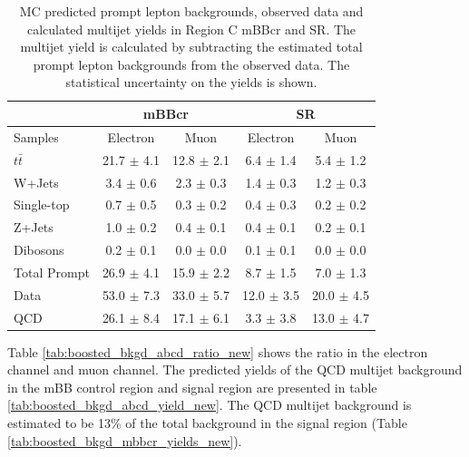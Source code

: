 \begin{table}
\begin{center}
\begin{tabular}{l|c|c||c|c}
             &\multicolumn{2}{c||}{mBBcr}               &\multicolumn{2}{c}{SR}\\
\hline
Samples       & Electron            & Muon               & Electron         & Muon     \\      
\hline
$t\bar{t}$          &   21.7	$\pm$ 4.1   &   12.8 $\pm$ 2.1	&  	6.4 $\pm$ 1.4		& 	5.4 $\pm$ 1.2\\
W+Jets          &   3.4 	$\pm$ 0.6   &    2.3 $\pm$ 0.3	&	1.4 $\pm$ 0.3		&  	1.2 $\pm$ 0.3\\
Single-top      &   0.7 	$\pm$ 0.5   &    0.3 $\pm$ 0.2	&	0.4 $\pm$ 0.3       	&  	0.2 $\pm$ 0.2\\
Z+Jets          &   1.0 	$\pm$ 0.2   &    0.4 $\pm$ 0.1	& 	0.4 $\pm$ 0.1        & 	0.2 $\pm$ 0.1\\
Dibosons   &   0.2 	$\pm$ 0.1   &    0.0 $\pm$ 0.0	&	0.1 $\pm$ 0.1       	& 	0.0 $\pm$ 0.0\\
\hline
Total Prompt         &   26.9 	$\pm$ 4.1   &   15.9 $\pm$ 2.2	&	8.7 $\pm$ 1.5       	& 	7.0 $\pm$ 1.3\\
\hline
Data           &   53.0 $\pm$ 7.3   &   33.0 $\pm$ 5.7	&	12.0 $\pm$ 3.5      	& 	20.0 $\pm$ 4.5\\
\hline
QCD            &   26.1 $\pm$ 8.4   &   17.1 $\pm$ 6.1	&	3.3 $\pm$ 3.8       	& 	13.0 $\pm$ 4.7\\
\end{tabular}
\end{center}
\caption[MC predicted prompt lepton backgrounds, observed data and calculated multijet yields
in Region C mBBcr and SR]{MC predicted prompt lepton backgrounds, observed data and calculated multijet yields
in Region C mBBcr and SR. The multijet yield is calculated by subtracting the estimated total prompt lepton
backgrounds from the observed data. The statistical uncertainty on the yields is shown.}
\label{tab:boosted_region_c_promptbkgd_data_new}
\end{table}


\indent Table \ref{tab:boosted_bkgd_abcd_ratio_new} shows the ratio in the electron channel and muon channel.
The predicted yields of the QCD multijet background in the mBB control region and signal region are presented in table \ref{tab:boosted_bkgd_abcd_yield_new}. The QCD multijet background is estimated to be 13\% of the total background in the signal region (Table \ref{tab:boosted_bkgd_mbbcr_yields_new}).

